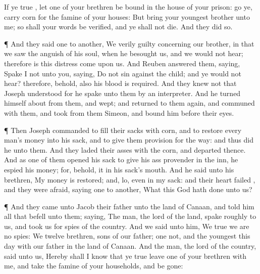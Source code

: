 {If ye
{}
true
{}, let
one of your
brethren be
bound in the
house of your
prison:
go ye,
carry
corn for the
famine of your
houses:
But
bring your
youngest
brother unto me; so shall your
words be
verified, and ye shall not
die. And they
did so.
\par }{\PP {}¶ And they
said
one to
another, We
{}
verily
guilty concerning our
brother, in
that we
saw the
anguish of his
soul, when he
besought us, and we would not
hear; therefore is this
distress
come upon us.
And
Reuben
answered them,
saying, Spake
I not unto you,
saying, Do not
sin against the
child; and ye would not
hear? therefore, behold, also his
blood is
required.
And they
knew not that
Joseph
understood
{} for he spake unto them by an
interpreter.
And he turned himself
about from them, and
wept; and returned to them
again, and
communed with them, and
took from them
Simeon, and
bound him before their
eyes.
\par }{\PP {}¶ Then
Joseph
commanded to
fill their
sacks with
corn, and to
restore every
man’s
money into his
sack, and to
give them
provision for the
way: and
thus did
he unto them.
And they
laded their
asses with the
corn, and
departed thence.
And as
one of them
opened his
sack to
give his
ass
provender in the
inn, he
espied his
money; for, behold, it
{} in his
sack’s
mouth.
And he
said unto his
brethren, My
money is
restored; and,
lo,
{} even in my
sack: and their
heart
failed
{}, and they were
afraid,
saying
one to
another, What
{} this
{}
God hath
done unto us?
\par }{\PP {}¶ And they
came unto
Jacob their
father unto the
land of
Canaan, and
told him all that
befell unto them;
saying,
The
man,
{} the
lord of the
land,
spake
roughly to us, and
took us for
spies of the
country.
And we
said unto him, We
{}
true
{} we are no
spies:
We
{}
twelve
brethren,
sons of our
father;
one
{} not, and the
youngest
{} this
day with our
father in the
land of
Canaan.
And the
man, the
lord of the
country,
said unto us, Hereby shall I
know that ye
{}
true
{}
leave
one of your
brethren
{} with me, and
take
{} the
famine of your
households, and be
gone:
}
